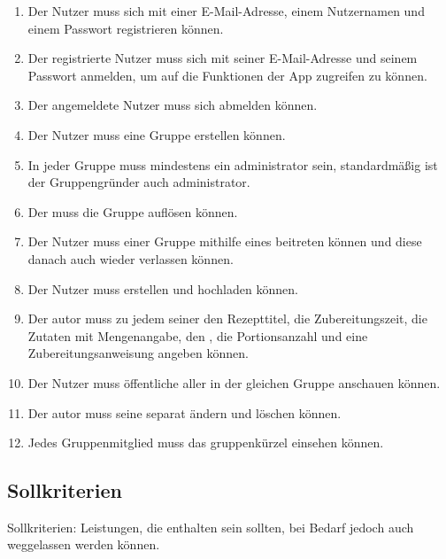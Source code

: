 \documentclass[parskip=full]{scrartcl}
\begin{document}
\begin{enumerate}[start=1,label={$\langle$\bfseries RM\arabic*$\rangle$}, leftmargin = 5em, itemsep=4pt, parsep=4pt]
    \item Der Nutzer muss sich mit einer E-Mail-Adresse, einem Nutzernamen und einem Passwort registrieren können.\label{rm:Registering}
    \item Der registrierte Nutzer muss sich mit seiner E-Mail-Adresse und seinem Passwort anmelden, um auf die Funktionen der App zugreifen zu können. \label{rm:Login}
    \item Der angemeldete Nutzer muss sich abmelden können. \label{rm:Logout}
    \item Der Nutzer muss eine Gruppe erstellen können. \label{rm:GroupCreation}
    \item In jeder Gruppe muss mindestens ein \Gls{administrator} sein, standardmäßig ist der Gruppengründer auch \Gls{administrator}.\label{rm:GroupAdmin}
    \item Der  muss die Gruppe auflösen können. \label{rm:GroupDeletion}
    \item Der Nutzer muss einer Gruppe mithilfe eines  beitreten können und diese danach auch wieder verlassen können.\label{rm:GroupJoining}
    \item Der Nutzer muss  erstellen und hochladen können. \label{rm:RecipeCreation}
    \item Der \Gls{autor} muss zu jedem seiner  den Rezepttitel, die Zubereitungszeit, die Zutaten mit Mengenangabe, den , die Portionsanzahl und eine Zubereitungsanweisung angeben können.\label{rm:RecipeContents}
    \item Der Nutzer muss öffentliche  aller  in der gleichen Gruppe anschauen können.\label{rm:RecipeViewing}
    \item Der \Gls{autor} muss seine  separat ändern und löschen können.\label{rm:RecipeManagement}
    \item Jedes Gruppenmitglied muss das \Gls{gruppenkürzel} einsehen können.\label{rm:GroupId}
\end{enumerate}

\subsection{Sollkriterien}
Sollkriterien: Leistungen, die enthalten sein sollten, bei Bedarf jedoch auch weggelassen werden können.
\end{document}
